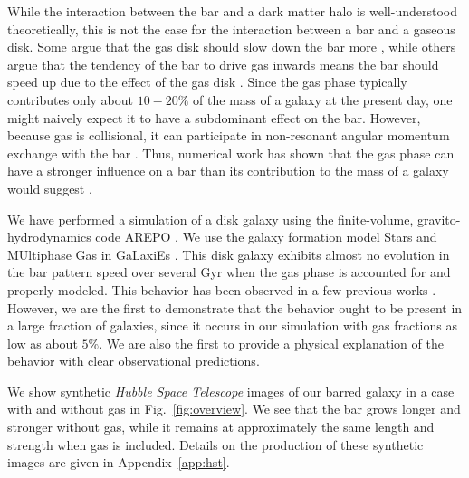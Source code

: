\documentclass[twocolumn,linenumbers]{aastex631}
\newcommand{\AREPO}{\textsc{AREPO}}
\newcommand{\SMUGGLE}{SMUGGLE}
\begin{document}
While the interaction between the bar and a dark matter halo is well-understood
theoretically, this is not the case for the interaction between a bar and a
gaseous disk. Some argue that the gas disk should slow down the bar more
\citep{2003MNRAS.341.1179A}, while others argue that the tendency of the bar to
drive gas inwards means the bar should speed up due to the effect of the gas
disk \citep{2013MNRAS.429.1949A, 2014MNRAS.438L..81A}. Since the gas phase
typically contributes only about $10-20\%$ of the mass of a galaxy at the
present day, one might naively expect it to have a subdominant effect on the
bar. However, because gas is collisional, it can participate in non-resonant
angular momentum exchange with the bar \citep{2011MNRAS.415.1027H}. Thus,
numerical work has shown that the gas phase can have a stronger influence on a
bar than its contribution to the mass of a galaxy would suggest
\citep{2010ApJ...719.1470V, 2013MNRAS.429.1949A}.

We have performed a simulation of a disk galaxy using the finite-volume,
gravito-hydrodynamics code \AREPO{} \citep{2010MNRAS.401..791S}. We use the galaxy
formation model Stars and MUltiphase Gas in GaLaxiEs
\citep[\SMUGGLE{};][]{2019MNRAS.489.4233M}. This disk galaxy exhibits almost no
evolution in the bar pattern speed over several Gyr when the gas phase is
accounted for and properly modeled. This behavior has been observed in a few
previous works \citep{1993AA...268...65F, 2010ApJ...719.1470V,
2014MNRAS.438L..81A}. However, we are the first to demonstrate that the behavior
ought to be present in a large fraction of galaxies, since it occurs in our
simulation with gas fractions as low as about $5\%$. We are also the first to
provide a physical explanation of the behavior with clear observational
predictions.

We show synthetic \textit{Hubble Space Telescope} images of our barred galaxy in
a case with and without gas in Fig.~\ref{fig:overview}. We see that the bar
grows longer and stronger without gas, while it remains at approximately the
same length and strength when gas is included. Details on the production of
these synthetic images are given in Appendix~\ref{app:hst}.

\end{document}
